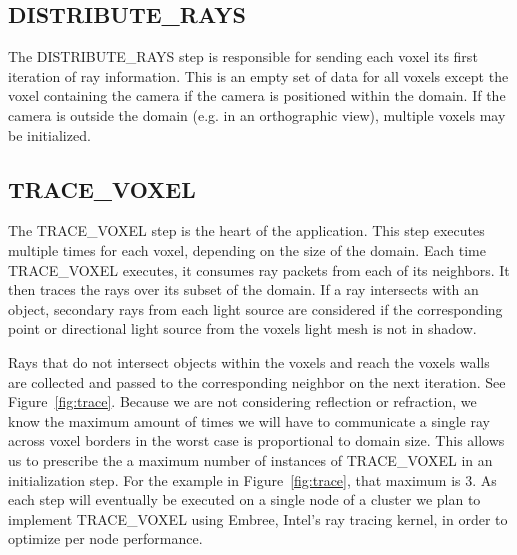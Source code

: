 \subsection{DISTRIBUTE\_RAYS}

The DISTRIBUTE\_RAYS step is responsible for sending each voxel its
first iteration of ray information. This is an empty set of data for
all voxels except the voxel containing the camera if the camera is
positioned within the domain. If the camera is outside the domain
(e.g. in an orthographic view), multiple voxels may be initialized.

\subsection{TRACE\_VOXEL}

The TRACE\_VOXEL step is the heart of the application. This step
executes multiple times for each voxel, depending on the size of the
domain. Each time TRACE\_VOXEL executes, it consumes ray packets from
each of its neighbors. It then traces the rays over its subset of the
domain. If a ray intersects with an object, secondary rays from each
light source are considered if the corresponding point or directional
light source from the voxels light mesh is not in shadow.

Rays that do not intersect objects within the voxels and reach the
voxels walls are collected and passed to the corresponding neighbor on
the next iteration. See Figure~\ref{fig:trace}. Because we are not
considering reflection or refraction, we know the maximum amount of
times we will have to communicate a single ray across voxel borders in
the worst case is proportional to domain size. This allows us to
prescribe the a maximum number of instances of TRACE\_VOXEL in an
initialization step. For the example in Figure~\ref{fig:trace}, that
maximum is 3. As each step will eventually be executed on a single
node of a cluster we plan to implement TRACE\_VOXEL using Embree,
Intel’s ray tracing kernel, in order to optimize per node performance.

